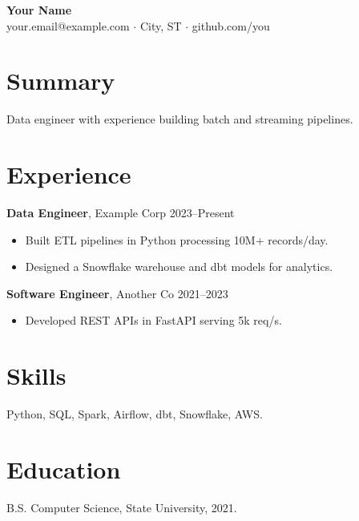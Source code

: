 \documentclass[11pt]{article}
\begin{document}
\begin{center}
  {\LARGE \textbf{Your Name}}\\
  your.email@example.com $\cdot$ City, ST $\cdot$ github.com/you
\end{center}

\section{Summary}
Data engineer with experience building batch and streaming pipelines.

\section{Experience}
\textbf{Data Engineer}, Example Corp \hfill 2023--Present
\begin{itemize}[leftmargin=*]
  \item Built ETL pipelines in Python processing 10M+ records/day.
  \item Designed a Snowflake warehouse and dbt models for analytics.
\end{itemize}

\textbf{Software Engineer}, Another Co \hfill 2021--2023
\begin{itemize}[leftmargin=*]
  \item Developed REST APIs in FastAPI serving 5k req/s.
\end{itemize}

\section{Skills}
Python, SQL, Spark, Airflow, dbt, Snowflake, AWS.

\section{Education}
B.S. Computer Science, State University, 2021.
\end{document}
